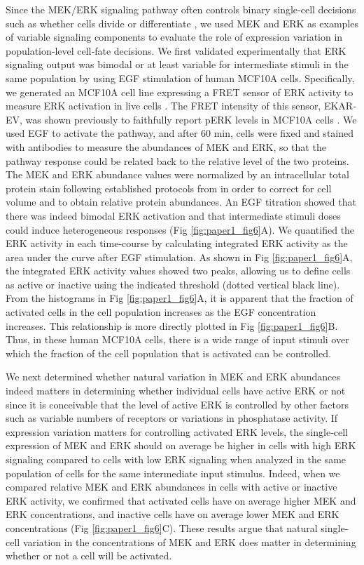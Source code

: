 Since the MEK/ERK signaling pathway often controls binary single‐cell decisions such as whether cells divide or differentiate \cite{Seger1995}, we used MEK and ERK as examples of variable signaling components to evaluate the role of expression variation in population‐level cell‐fate decisions. We first validated experimentally that ERK signaling output was bimodal or at least variable for intermediate stimuli in the same population by using EGF stimulation of human MCF10A cells. Specifically, we generated an MCF10A cell line expressing a FRET sensor of ERK activity to measure ERK activation in live cells \cite{Albeck2013,Aoki2013}. The FRET intensity of this sensor, EKAR‐EV, was shown previously to faithfully report pERK levels in MCF10A cells \cite{Yang2017}. We used EGF to activate the pathway, and after 60 min, cells were fixed and stained with antibodies to measure the abundances of MEK and ERK, so that the pathway response could be related back to the relative level of the two proteins. The MEK and ERK abundance values were normalized by an intracellular total protein stain following established protocols from \cite{Kafri2013} in order to correct for cell volume and to obtain relative protein abundances. An EGF titration showed that there was indeed bimodal ERK activation and that intermediate stimuli doses could induce heterogeneous responses (Fig \ref{fig:paper1_fig6}A). We quantified the ERK activity in each time-course by calculating integrated ERK activity as the area under the curve after EGF stimulation. As shown in Fig \ref{fig:paper1_fig6}A, the integrated ERK activity values showed two peaks, allowing us to define cells as active or inactive using the indicated threshold (dotted vertical black line). From the histograms in Fig \ref{fig:paper1_fig6}A, it is apparent that the fraction of activated cells in the cell population increases as the EGF concentration increases. This relationship is more directly plotted in Fig \ref{fig:paper1_fig6}B. Thus, in these human MCF10A cells, there is a wide range of input stimuli over which the fraction of the cell population that is activated can be controlled.

We next determined whether natural variation in MEK and ERK abundances indeed matters in determining whether individual cells have active ERK or not since it is conceivable that the level of active ERK is controlled by other factors such as variable numbers of receptors or variations in phosphatase activity. If expression variation matters for controlling activated ERK levels, the single‐cell expression of MEK and ERK should on average be higher in cells with high ERK signaling compared to cells with low ERK signaling when analyzed in the same population of cells for the same intermediate input stimulus. Indeed, when we compared relative MEK and ERK abundances in cells with active or inactive ERK activity, we confirmed that activated cells have on average higher MEK and ERK concentrations, and inactive cells have on average lower MEK and ERK concentrations (Fig \ref{fig:paper1_fig6}C). These results argue that natural single‐cell variation in the concentrations of MEK and ERK does matter in determining whether or not a cell will be activated.


